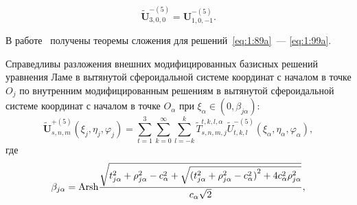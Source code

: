 \begin{equation}\label{eq:1:99a}
\mathbf{\tilde U}_{3,0,0}^{-(5)}=\mathbf{U}_{1,0,-1}^{-(5)}.
\end{equation}

В работе~\cite{Nikolaev2014-1} получены теоремы сложения для решений~\eqref{eq:1:89a}~--- \eqref{eq:1:99a}.

\begin{theorem}
Справедливы разложения внешних модифицированных базисных решений уравнения Ламе в вытянутой сфероидальной системе координат с началом в точке $O_j$ по внутренним модифицированным решениям в вытянутой сфероидальной системе координат с началом в точке $O_\alpha$ при $\xi_\alpha\in(0,\beta_{j\alpha})$:
\begin{equation}
\mathbf{\tilde U}_{s,n,m}^{+(5)}(\xi_j,\eta_j,\varphi_j)=\sum\limits_{t=1}^3\sum\limits_{k=0}^\infty\sum\limits_{l=-k}^k\tilde T_{s,n,m,j}^{t,k,l,\alpha}\tilde U_{t,k,l}^{-(5)}(\xi_\alpha,\eta_\alpha,\varphi_\alpha),
\label{eq:1:100t}
\end{equation}
\noindent где
\begin{equation*}
\beta_{j\alpha}={\rm{Arsh}}\frac{{\sqrt {t_{j\alpha }^2 + \rho _{j\alpha }^2 - c_\alpha ^2 + \sqrt {{{(t_{j\alpha }^2 + \rho _{j\alpha }^2 - c_\alpha ^2)}^2} + 4c_\alpha ^2\rho _{j\alpha }^2} } }}{{{c_\alpha }\sqrt 2 }},
\end{equation*}


\end{theorem}
